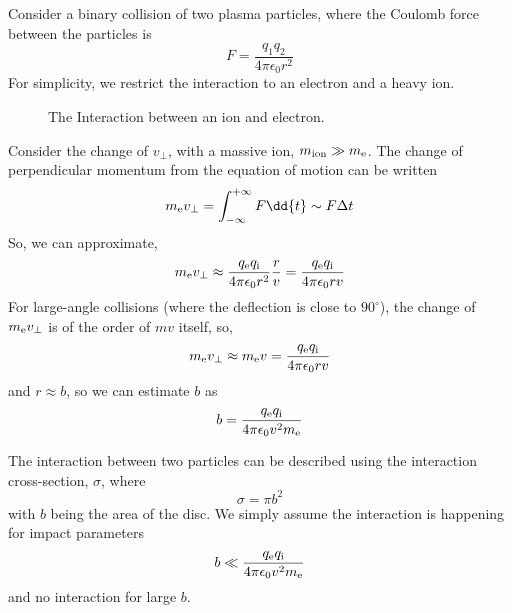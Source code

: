 \documentclass{book}         		                %
\begin{document}
Consider a binary collision of two plasma particles, where the Coulomb
force between the particles is
\begin{equation}
  \label{eq:15}
  F = \frac{q_1 q_2}{4 \pi \epsilon_0 r^2}
\end{equation}
For simplicity, we restrict the interaction to an electron and a heavy ion.
\begin{figure}
  \centering
  \caption{The Interaction between an ion and electron.}
  \label{fig:electronioninter}
\end{figure}
Consider the change of $v_{\perp}$, with a massive ion, $m_{\rm ion}
\gg m_{\rm e}$. The change of perpendicular momentum from the equation
of motion can be written
\begin{equation}
  \label{eq:16}
  m_{\rm e} v_{\perp} = \int_{-\infty}^{+\infty} F \dd{t} \sim F \Delta t
\end{equation}
So, we can approximate,
\[ m_{\rm e} v_{\perp} \approx \frac{q_{\rm e} q_{\rm i}}{4 \pi
  \epsilon_0 r^{2} } \frac{r}{v} = \frac{q_{\rm e} q_{\rm i}}{4 \pi
  \epsilon_0 r v }  \] 
For large-angle collisions (where the deflection
is close to $90^{\circ}$), the change of $m_{\rm e} v_{\perp}$ is of
the order of $mv$ itself, so,
\[ m_{\rm e} v_{\perp} \approx m_{\rm e} v = \frac{q_{\rm e} q_{\rm i}}{4 \pi
   \epsilon_0 r v }\]
and $r \approx b$, so we can estimate $b$ as 
\[ b = \frac{q_{\rm e} q_{\rm i}}{4 \pi \epsilon_0 v^2 m_{\rm e}} \]

The interaction between two particles can be described using the
interaction cross-section, $\sigma$, where
\[ \sigma = \pi b^2 \] with $b$ being the area of the disc. We simply
assume the interaction is happening for impact parameters
\[ b \ll \frac{q_{\rm e} q_{\rm i}}{4 \pi \epsilon_0 v^2 m_{\rm e}} \]
and no interaction for large $b$.
\end{document}
